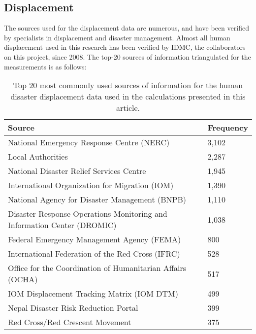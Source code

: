 \documentclass[10pt,a4paper]{article}
\begin{document}
\begin{multicols}{1}
\subsection{Displacement}\label{sec:Disp}
The sources used for the displacement data are numerous, and have been verified by specialists in displacement and disaster management. Almost all human displacement used in this research has been verified by IDMC, the collaborators on this project, since 2008. The top-20 sources of information triangulated for the measurements is as follows:
\begin{table}[H]
  \begin{centering}
  \caption{Top 20 most commonly used sources of information for the human disaster displacement data used in the calculations presented in this article.}
  \label{tab:IDMCsources}
  \begin{tabular}{|l|l|}
    \hline
    Source                                                              & Frequency \\
    \hline
    National Emergency Response Centre (NERC)                               & 3,102      \\
    Local Authorities                                                       & 2,287      \\
    National Disaster Relief Services Centre                                & 1,945      \\
    International Organization for Migration (IOM)                          & 1,390      \\
    National Agency for Disaster Management (BNPB)                          & 1,110      \\
    Disaster Response Operations Monitoring and Information Center (DROMIC) & 1,038      \\
    Federal Emergency Management Agency (FEMA)                              & 800       \\
    International Federation of the Red Cross (IFRC)                        & 528       \\
    Office for the Coordination of Humanitarian Affairs (OCHA)              & 517       \\
    IOM Displacement Tracking Matrix (IOM DTM)                              & 499       \\
    Nepal Disaster Risk Reduction Portal                                    & 399       \\
    Red Cross/Red Crescent Movement                                         & 375       \\

\end{tabular}
\end{centering}
\end{table}
\end{multicols}
\end{document}
